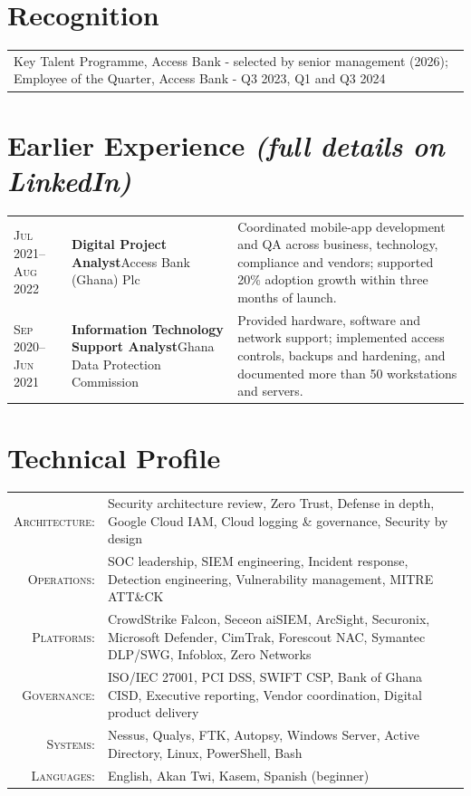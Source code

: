 \documentclass[a4paper,11pt]{article}
\begin{document}
\section{Recognition}
\begin{tabular}{p{}}
Key Talent Programme, Access Bank - selected by senior management (2026); Employee of the Quarter, Access Bank - Q3 2023, Q1 and Q3 2024
\end{tabular}
\newpage
\begingroup
\titlespacing{\section}{0pt}{1em}{4pt}
\section{Earlier Experience \hfill{\normalfont\footnotesize\itshape (full details on LinkedIn)}}
\begin{longtable}{@{}p{}|p{}|p{}@{}}
\textsc{Jul 2021--Aug 2022} & \textbf{Digital Project Analyst}\newline Access Bank (Ghana) Plc & Coordinated mobile-app development and QA across business, technology, compliance and vendors; supported 20\% adoption growth within three months of launch.\\[8pt]
\textsc{Sep 2020--Jun 2021} & \textbf{Information Technology Support Analyst}\newline Ghana Data Protection Commission & Provided hardware, software and network support; implemented access controls, backups and hardening, and documented more than 50 workstations and servers.\\[8pt]
\end{longtable}
\section{Technical Profile}
\begin{tabular}{r p{}}
\textsc{Architecture:} & Security architecture review, Zero Trust, Defense in depth, Google Cloud IAM, Cloud logging \& governance, Security by design\\[3pt]
\textsc{Operations:} & SOC leadership, SIEM engineering, Incident response, Detection engineering, Vulnerability management, MITRE ATT\&CK\\[3pt]
\textsc{Platforms:} & CrowdStrike Falcon, Seceon aiSIEM, ArcSight, Securonix, Microsoft Defender, CimTrak, Forescout NAC, Symantec DLP/SWG, Infoblox, Zero Networks\\[3pt]
\textsc{Governance:} & ISO/IEC 27001, PCI DSS, SWIFT CSP, Bank of Ghana CISD, Executive reporting, Vendor coordination, Digital product delivery\\[3pt]
\textsc{Systems:} & Nessus, Qualys, FTK, Autopsy, Windows Server, Active Directory, Linux, PowerShell, Bash\\[3pt]
\textsc{Languages:} & English, Akan Twi, Kasem, Spanish (beginner)\\[3pt]
\end{tabular}
\end{document}
